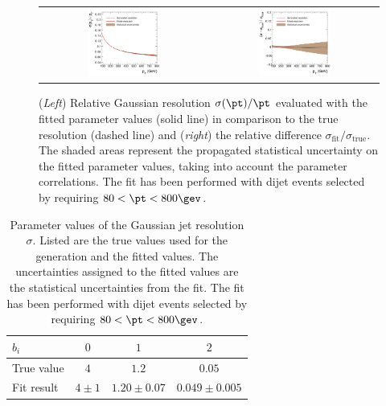 \begin{figure}[ht]
  \centering
  \begin{tabular}{cc}
    \includegraphics[width=0.45\textwidth]{figures/resFit_ToyMC_PtCuts_Sigma} &
    \includegraphics[width=0.45\textwidth]{figures/resFit_ToyMC_PtCuts_SigmaRelDifference} \\
  \end{tabular}
  \caption{(\textit{Left}) Relative Gaussian resolution $\sigma(\pt)/\pt$ evaluated with the fitted
    parameter values (solid line) in comparison to the true resolution
    (dashed line) and (\textit{right}) the relative difference
    $\sigma_{\text{fit}} / \sigma_{\text{true}}$.
    The shaded areas represent the propagated statistical
    uncertainty on the fitted parameter values, taking into account the
    parameter correlations.
    The fit has been performed with dijet events selected by requiring \mbox{$80 < \pt < 800\gev$}.}
  \label{fig:ResFit:ToyMC:PtCuts:FittedSigma}
\end{figure}


\begin{table}[ht]
  \caption{Parameter values of the Gaussian jet \pt resolution
    $\sigma$.
    Listed are the true values used for the generation and
    the fitted values.
    The uncertainties assigned to the fitted values
    are the statistical uncertainties from the fit.
    The fit has been performed with dijet events selected by requiring
    \mbox{$80 < \pt < 800\gev$}.}
  \centering
  \begin{tabular}[ht]{lccc}
    \toprule
    $b_{i}$ & $0$ & $1$ & $2$ \\
    \midrule
    True value & $4$           & $1.2$                   & $0.05$ \\
    Fit result   & $4 \pm 1$ & $1.20 \pm 0.07$ & $0.049 \pm 0.005$ \\
    \bottomrule
   \end{tabular}
 \label{tab:ResFit:ToyMC:PtCuts:FitResult}
\end{table}



